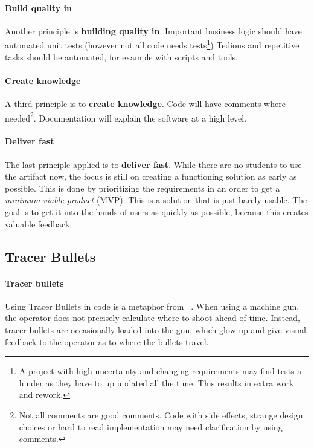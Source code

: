 \paragraph{Build quality in}
Another principle is \textbf{building quality in}.
Important business logic should have automated unit tests (however not all code needs tests\footnote{A project with high uncertainty and changing requirements may find tests a hinder as they have to up updated all the time. This results in extra work and rework.})
Tedious and repetitive tasks should be automated, for example with scripts and tools.


\paragraph{Create knowledge}
A third principle is to \textbf{create knowledge}.
Code will have comments where needed\footnote{Not all comments are good comments. Code with side effects, strange design choices or hard to read implementation may need clarification by using comments.}.
Documentation will explain the software at a high level.


\paragraph{Deliver fast}
The last principle applied is to \textbf{deliver fast}.
While there are no students to use the artifact now, the focus is still on creating a functioning solution as early as possible.
This is done by prioritizing the requirements in an order to get a \textit{minimum viable product} (MVP).
This is a solution that is just barely usable.
The goal is to get it into the hands of users as quickly as possible, because this creates valuable feedback.

\subsection{Tracer Bullets}

\paragraph{Tracer bullets}
Using Tracer Bullets in code is a metaphor from ~\cite{huntPragmaticProgrammerJourneyman2000}.
When using a machine gun, the operator does not precisely calculate where to shoot ahead of time.
Instead, tracer bullets are occasionally loaded into the gun, which glow up and give visual feedback to the operator as to where the bullets travel.


